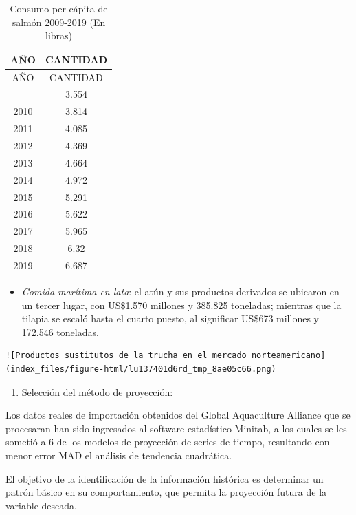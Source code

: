 \documentclass[
  stu,
  floatsintext,
  longtable,
  a4paper,
  nolmodern,
  notxfonts,
  notimes,
  12pt,
  colorlinks=true,linkcolor=blue,citecolor=blue,urlcolor=blue]{apa7}
\providecommand{\tightlist}{%
  \setlength{\itemsep}{0pt}\setlength{\parskip}{0pt}}
\begin{document}
\begin{longtable}[]{@{}cc@{}}
\caption{Consumo per cápita de salmón 2009-2019 (En
libras)}\tabularnewline
\toprule\noalign{}
AÑO & CANTIDAD \\
\midrule\noalign{}
\endfirsthead
\toprule\noalign{}
AÑO & CANTIDAD \\
\midrule\noalign{}
\endhead
\bottomrule\noalign{}
\endlastfoot
2009 & 3.554 \\
2010 & 3.814 \\
2011 & 4.085 \\
2012 & 4.369 \\
2013 & 4.664 \\
2014 & 4.972 \\
2015 & 5.291 \\
2016 & 5.622 \\
2017 & 5.965 \\
2018 & 6.32 \\
2019 & 6.687 \\
\end{longtable}

\begin{itemize}
\tightlist
\item
  \emph{Comida marítima en lata}: el atún y sus productos derivados se
  ubicaron en un tercer lugar, con US\$1.570 millones y 385.825
  toneladas; mientras que la tilapia se escaló hasta el cuarto puesto,
  al significar US\$673 millones y 172.546 toneladas.
\end{itemize}

\begin{verbatim}
![Productos sustitutos de la trucha en el mercado norteamericano](index_files/figure-html/lu137401d6rd_tmp_8ae05c66.png)
\end{verbatim}

\begin{enumerate}
\def\labelenumi{\alph{enumi})}
\setcounter{enumi}{1}
\tightlist
\item
  Selección del método de proyección:
\end{enumerate}

Los datos reales de importación obtenidos del Global Aquaculture
Alliance que se procesaran han sido ingresados al software estadístico
Minitab, a los cuales se les sometió a 6 de los modelos de proyección de
series de tiempo, resultando con menor error MAD el análisis de
tendencia cuadrática.

El objetivo de la identificación de la información histórica es
determinar un patrón básico en su comportamiento, que permita la
proyección futura de la variable deseada.
\end{document}
